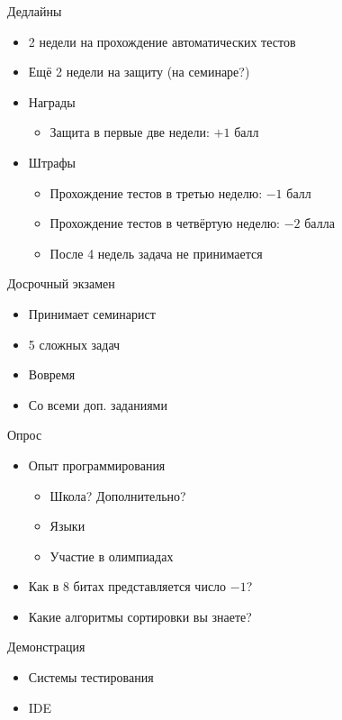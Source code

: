 \documentclass[aspectratio=169,14pt]{beamer}
\begin{document}
    \begin{frame}{Дедлайны}
        \begin{itemize}
            \item 2 недели на прохождение автоматических тестов
            \item Ещё 2 недели на защиту (на семинаре?)
            \item Награды
                \begin{itemize}
                    \item Защита в первые две недели: $+1$ балл
                \end{itemize}
            \item Штрафы
                \begin{itemize}
                    \item Прохождение тестов в третью неделю: $-1$ балл
                    \item Прохождение тестов в четвёртую неделю: $-2$ балла
                    \item После 4 недель задача не принимается
                \end{itemize}
        \end{itemize}
    \end{frame}

    \begin{frame}{Досрочный экзамен}
        \begin{itemize}
            \item Принимает семинарист
            \item 5 сложных задач
            \item Вовремя
            \item Со всеми доп. заданиями %
        \end{itemize}
    \end{frame}

    \begin{frame}{Опрос}
        \begin{itemize}
            \item Опыт программирования
                \begin{itemize}
                    \item Школа? Дополнительно?
                    \item Языки
                    \item Участие в олимпиадах
                \end{itemize}
            \item Как в 8 битах представляется число $-1$?
            \item Какие алгоритмы сортировки вы знаете?
        \end{itemize}
    \end{frame}

    \begin{frame}{Демонстрация}
        \begin{itemize}
            \item Системы тестирования
            \item IDE
        \end{itemize}
    \end{frame}
\end{document}
